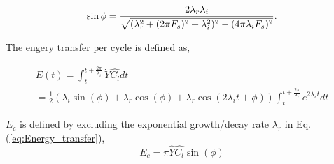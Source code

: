 \begin{equation}
\sin{\phi} = \frac{2\lambda_r\lambda_i}{\sqrt{(\lambda_r^2  \\
+ (2\pi F_s)^2 + \lambda_i^2)^2 - (4\pi\lambda_i F_s)^2 }}.
\label{eq:phase_angle}
\end{equation}

The engery transfer per cycle is defined as,

\begin{equation}
\begin{array}{ll}
\displaystyle E(t) = \int_{t}^{t+\frac{2 \pi}{\lambda_i}} \dot{Y} \hat{C_l} dt \\
\displaystyle  = \frac{1}{2}(\lambda_i \sin(\phi) + \lambda_r \cos(\phi) + \lambda_r \cos(2 \lambda_i t + \phi))
\int_{t}^{t+\frac{2 \pi}{\lambda_i}} e^{2 \lambda_r t} dt
\end{array}
\label{eq:Energy_transfer}
\end{equation}

$E_c$ is defined by excluding the exponential growth/decay rate $\lambda_r$ in Eq. (\ref{eq:Energy_transfer}),
\begin{equation}
E_c = \pi \hat{Y} \hat{C_l} \sin(\phi)
\end{equation}








